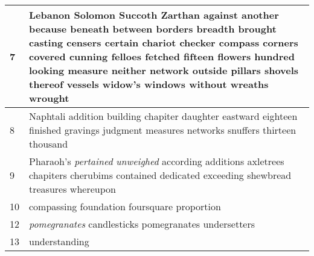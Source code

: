 \begin{center}
\begin{longtable}{p{0.4in}|p{3.6in}}
7 & Lebanon Solomon Succoth Zarthan against another because beneath between borders breadth brought casting censers certain chariot checker compass corners covered cunning felloes fetched fifteen flowers hundred looking measure neither network outside pillars shovels thereof vessels widow's windows without wreaths wrought \\ \hline
8 & Naphtali addition building chapiter daughter eastward eighteen finished gravings judgment measures networks snuffers thirteen thousand \\ \hline
9 & Pharaoh's \emph{pertained} \emph{unweighed} according additions axletrees chapiters cherubims contained dedicated exceeding shewbread treasures whereupon \\ \hline
10 & compassing foundation foursquare proportion \\ \hline
12 & \emph{pomegranates} candlesticks pomegranates undersetters \\ \hline
13 & understanding \\ \hline



\end{longtable}
\end{center}
 
